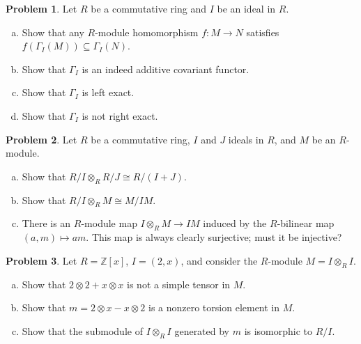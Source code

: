 \documentclass[11pt]{article}
\newcommand{\Z}{\mathbb{Z}}
\theoremstyle{definition}
\newtheorem{problem}{Problem}
\begin{document}
\vspace{1.5em}

\noindent
{} 
	
	
	
	
\begin{problem} 
Let $R$ be a commutative ring and $I$ be an ideal in $R$.
	\begin{enumerate}[a)]
		\item Show that any $R$-module homomorphism $f\!: M \to N$ satisfies $f(\Gamma_I(M)) \subseteq \Gamma_I(N)$.
		\item Show that $\Gamma_I$ is an indeed additive covariant functor.
		\item Show that $\Gamma_I$ is left exact.
		\item Show that $\Gamma_I$ is not right exact.
	\end{enumerate}
\end{problem}



\vfill


\begin{problem}
Let $R$ be a commutative ring, $I$ and $J$ ideals in $R$, and $M$ be an $R$-module.
\begin{enumerate}[a)]
	\item Show that $R/I \otimes_R R/J \cong R/(I+J)$.
	\item Show that $R/I \otimes_R M \cong M/IM$.
	\item There is an $R$-module map $I \otimes_R M \longrightarrow IM$ induced by the $R$-bilinear map $(a,m) \mapsto am$. This map is always clearly surjective; must it be injective?
\end{enumerate}
\end{problem}

\vfill


\begin{problem}
	Let $R = \Z[x]$, $I = (2,x)$, and consider the $R$-module $M = I \otimes_R I$.
	\begin{enumerate}[a)]
		\item Show that $2 \otimes 2 + x \otimes x$ is not a simple tensor in $M$.
		\item Show that $m = 2 \otimes x - x \otimes 2$ is a nonzero torsion element in $M$.
		\item Show that the submodule of $I \otimes_R I$ generated by $m$ is isomorphic to $R/I$.
	\end{enumerate}
\end{problem}
\end{document}
